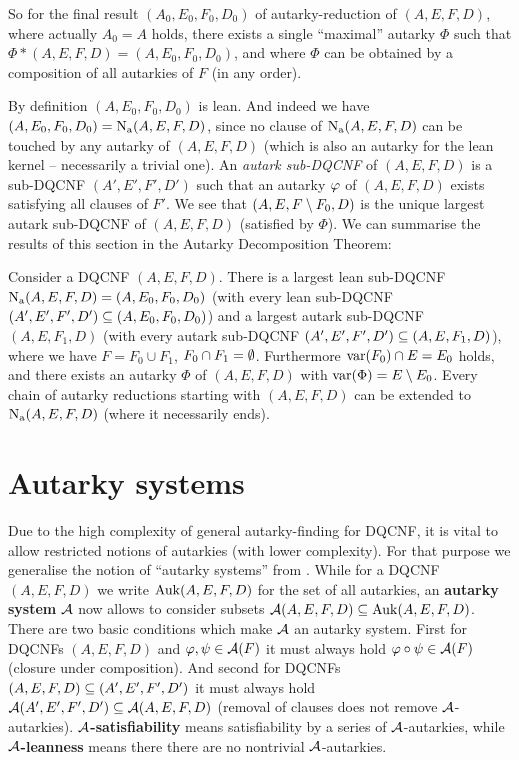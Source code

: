 \documentclass[conference]{IEEEtran}
\begin{document}
So for the final result $(A_0, E_0, F_0, D_0)$ of autarky-reduction of $(A,E,F,D)$, where actually $A_0 = A$ holds, there exists a single ``maximal'' autarky $\Phi$ such that $\Phi * (A,E,F,D) = (A,E_0,F_0,D_0)$, and where $\Phi$ can be obtained by a composition of all autarkies of $F$ (in any order).

By definition $(A,E_0,F_0,D_0)$ is lean. And indeed we have $(A,E_0,F_0,D_0) = \operatorname{\operatorname{N}_a}(A,E,F,D)$, since no clause of $\operatorname{\operatorname{N}_a}(A,E,F,D)$ can be touched by any autarky of $(A,E,F,D)$ (which is also an autarky for the lean kernel -- necessarily a trivial one). An \emph{autark sub-DQCNF} of $(A,E,F,D)$ is a sub-DQCNF $(A',E',F',D')$ such that an autarky $\varphi$ of $(A,E,F,D)$ exists satisfying all clauses of $F'$. We see that $(A,E,F \setminus F_0, D)$ is the unique largest autark sub-DQCNF of $(A,E,F,D)$ (satisfied by $\Phi$).
We can summarise the results of this section in the Autarky Decomposition Theorem:\vspace{-1ex}
\begin{thm}\label{thm:decomp}
  Consider a DQCNF $(A,E,F,D)$. There is a largest lean sub-DQCNF $\operatorname{\operatorname{N}_a}(A,E,F,D) = (A,E_0,F_0,D_0)$ (with every lean sub-DQCNF $(A',E',F',D') \subseteq (A,E_0,F_0,D_0)$) and a largest autark sub-DQCNF $(A,E,F_1,D)$ (with every autark sub-DQCNF $(A',E',F',D') \subseteq (A,E,F_1,D)$), where we have $F = F_0 \cup F_1$, $F_0 \cap F_1 = \emptyset$. Furthermore $\operatorname{var}(F_0) \cap E = E_0$ holds, and there exists an autarky $\Phi$ of $(A,E,F,D)$ with $\operatorname{var}(\Phi) = E \setminus E_0$. Every chain of autarky reductions starting with $(A,E,F,D)$ can be extended to $\operatorname{\operatorname{N}_a}(A,E,F,D)$ (where it necessarily ends).
\end{thm}


\section{Autarky systems}
\label{sec:autsys}

Due to the high complexity of general autarky-finding for DQCNF, it is vital to allow restricted notions of autarkies (with lower complexity).
For that purpose we generalise the notion of ``autarky systems'' from \cite[Section 11.11]{Kullmann2007HandbuchMU}.
While for a DQCNF $(A,E,F,D)$ we write $\operatorname{Auk}(A,E,F,D)$ for the set of all autarkies, an \textbf{autarky system} $\mathcal{A}$ now allows to consider subsets $\mathcal{A}(A,E,F,D) \subseteq \operatorname{Auk}(A,E,F,D)$.
There are two basic conditions which make $\mathcal{A}$ an autarky system.
First for DQCNFs $(A,E,F,D)$ and $\varphi, \psi \in \mathcal{A}(F)$ it must always hold $\varphi \circ \psi \in \mathcal{A}(F)$ (closure under composition).
And second for DQCNFs $(A,E,F,D) \subseteq (A',E',F',D')$ it must always hold $\mathcal{A}(A',E',F',D') \subseteq \mathcal{A}(A,E,F,D)$ (removal of clauses does not remove $\mathcal{A}$-autarkies).
\textbf{$\mathcal{A}$-satisfiability} means satisfiability by a series of $\mathcal{A}$-autarkies, while \textbf{$\mathcal{A}$-leanness} means there there are no nontrivial $\mathcal{A}$-autarkies.
\end{document}
